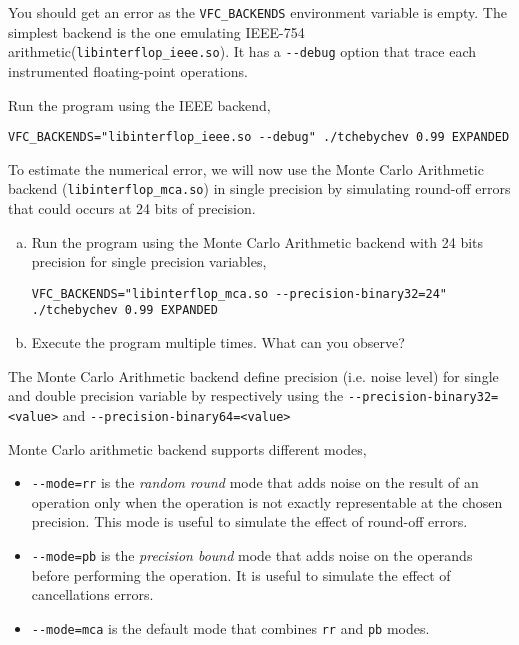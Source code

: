 You should get an error as the \texttt{VFC\_BACKENDS} environment variable is empty.
The simplest backend is the one emulating IEEE-754 arithmetic(\texttt{libinterflop\_ieee.so}). 
It has a \texttt{-{}-debug} option that trace each instrumented floating-point operations.

\begin{question}
Run the program using the IEEE backend,
\begin{verbatim}
VFC_BACKENDS="libinterflop_ieee.so --debug" ./tchebychev 0.99 EXPANDED
\end{verbatim}
\end{question}

To estimate the numerical error, we will now use the Monte Carlo Arithmetic backend
(\texttt{libinterflop\_mca.so}) in single precision by simulating round-off errors that could occurs at 24 bits of precision.

\begin{question}
  \begin{enumerate}[(a)]
  \item Run the program using the Monte Carlo Arithmetic backend with 24 bits precision for single precision variables,
\begin{verbatim}
VFC_BACKENDS="libinterflop_mca.so --precision-binary32=24" ./tchebychev 0.99 EXPANDED
\end{verbatim}
  \item Execute the program multiple times. What can you observe?
  \end{enumerate}
\end{question}

The Monte Carlo Arithmetic backend define precision (i.e. noise level) for single and double precision variable by respectively using the  \texttt{-{}-precision-binary32=<value>} and \texttt{-{}-precision-binary64=<value>} 

Monte Carlo arithmetic backend supports different modes,
\begin{itemize}

  \item \texttt{-{}-mode=rr} is the \emph{random round} mode that adds noise on the
    result of an operation only when the operation is not exactly representable
    at the chosen precision. This mode is useful to simulate the effect of
    round-off errors.

  \item \texttt{-{}-mode=pb} is the \emph{precision bound} mode that adds noise on
  the operands before performing the operation. It is useful to simulate the
    effect of cancellations errors.

  \item \texttt{-{}-mode=mca} is the default mode that combines \texttt{rr} and
  \texttt{pb} modes.

\end{itemize}

